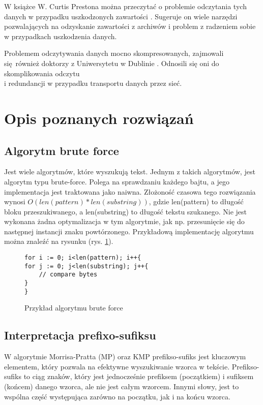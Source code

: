 W książce W. Curtis Prestona można przeczytać o problemie odczytania tych danych w przypadku
uszkodzonych zawartości \cite{bib:ksiazka:ArchiwizacjaIOdzyskiwanie}. Sugeruje
on wiele narzędzi pozwalających na odzyskanie zawartości z archiwów i problem
z radzeniem sobie w przypadkach uszkodzenia danych.

Problemem odczytywania danych mocno skompresowanych, zajmowali się również 
doktorzy z Uniwersytetu w Dublinie \cite{bib:internet:KompresjaDanych}. Odnosili
się oni do skomplikowania odczytu \\ i redundancji w przypadku transportu danych
przez sieć.

\section{Opis poznanych rozwiązań}

\subsection{Algorytm brute force}

Jest wiele algorytmów, które wyszukują tekst. Jednym z takich algorytmów, jest 
algorytm typu brute-force. Polega na sprawdzaniu każdego bajtu, a jego implementacja
jest traktowana jako naiwna. Złożoność czasowa tego rozwiązania wynosi
$O(len(pattern) * len(substring))$, gdzie len(pattern) to długość bloku 
przeszukiwanego, a len(substring) to długość tekstu szukanego. Nie jest wykonana
żadna optymalizacja w tym algorytmie, jak np. przesunięcie się do następnej
 instancji znaku powtórzonego. Przykładową implementację algorytmu można znaleźć
  na rysunku (rys. \ref{fig:code:bruteForceComparison}).

\begin{figure}[htbp]
\centering
\begin{lstlisting}
for i := 0; i<len(pattern); i++{
for j := 0; j<len(substring); j++{
    // compare bytes
}
}
\end{lstlisting}
\caption{Przykład algorytmu brute force}
\label{fig:code:bruteForceComparison}
\end{figure}

\subsection{Interpretacja prefixo-sufiksu}

W algorytmie Morrisa-Pratta (MP) oraz KMP prefikso-sufiks jest kluczowym elementem, który
pozwala na efektywne wyszukiwanie wzorca w tekście.
Prefikso-sufiks to ciąg znaków, który jest jednocześnie prefiksem (początkiem)
i sufiksem (końcem) danego wzorca, ale nie jest całym wzorcem. Innymi słowy, 
jest to wspólna część występująca zarówno na początku, jak i na końcu wzorca.


